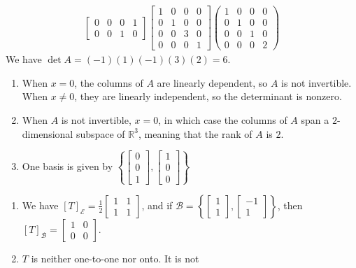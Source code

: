 \documentclass[red]{tutorial}
\newcommand{\R}{\mathbb{R}}
\newcommand{\mat}[1]{\begin{bmatrix} #1 %
\end{bmatrix}}
\theoremstyle{definition}
\theoremstyle{theorem}
\begin{document}
{\begin{solutions}
\begin{enumerate*}
\begin{align*}
\begin{bmatrix}
          0 & 0 & 0 & 1 \\
          0 & 0 & 1 & 0
        \end{bmatrix}
        \begin{bmatrix}
          1 & 0 & 0 & 0 \\
          0 & 1 & 0 & 0 \\
          0 & 0 & 3 & 0 \\
          0 & 0 & 0 & 1
        \end{bmatrix}
        \begin{pmatrix}
          1 & 0 & 0 & 0 \\
          0 & 1 & 0 & 0 \\
          0 & 0 & 1 & 0 \\
          0 & 0 & 0 & 2
        \end{pmatrix}
      \end{align*}
      We have $\det A=(-1)(1)(-1)(3)(2)=6$.
    \item
      \begin{enumerate}
        \item
          When $x=0$, the columns of $A$ are linearly dependent, so $A$ is not
          invertible. When $x\neq 0$, they are linearly independent, so the
          determinant is nonzero.
        \item
          When $A$ is not invertible, $x=0$, in which case the columns of $A$
          span a $2$-dimensional subspace of $\R^3$, meaning that the rank of
          $A$ is $2$.
        \item
          One basis is given by $\left\{\mat{0\\0\\1} , \mat{1\\0\\0}\right\}$
      \end{enumerate}
    \pagebreak %
    \item
      \begin{enumerate}
        \item
          We have
          $[T]_{\mathcal{E}} = \displaystyle\frac12\mat{1&1\\1&1}$,
          and if $\mathcal{B} = \left\{\mat{1\\1},\mat{-1\\1}\right\}$,
          then $[T]_{\mathcal{B}} = \mat{1&0\\0&0}$.
        \item $T$ is neither one-to-one nor onto. It is not

\end{enumerate}
\end{enumerate*}
\end{solutions}}
\end{document}
